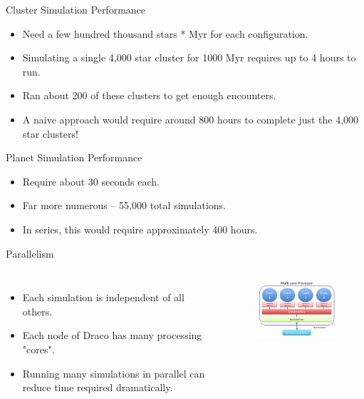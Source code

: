 \documentclass{beamer}
\begin{document}
\begin{frame}{Cluster Simulation Performance}
    \begin{itemize}
        \item Need a few hundred thousand stars * Myr for each configuration.
        \item Simulating a single 4,000 star cluster for 1000 Myr requires up to 4 hours
            to run.
        \item Ran about 200 of these clusters to get enough encounters.
        \item A naive approach would require around 800 hours to complete just the 4,000
            star clusters!
    \end{itemize}
\end{frame}

\begin{frame}{Planet Simulation Performance}
    \begin{itemize}
        \item Require about 30 seconds each.
        \item Far more numerous -- 55,000 total simulations.
        \item In series, this would require approximately 400 hours.
    \end{itemize}
\end{frame}

\begin{frame}{Parallelism}
    \begin{columns}
        \begin{itemize}
            \item Each simulation is independent of all others.
            \item Each node of Draco has many processing "cores".
            \item Running many simulations in parallel can reduce
                time required dramatically.
        \end{itemize}
        \begin{figure}
            \centering
            \includegraphics[width=2.0in]{multicore}
        \end{figure}
    \end{columns}
\end{frame}
\end{document}
